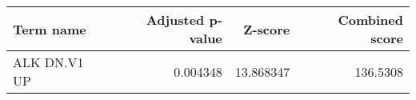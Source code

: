 \begin{tabular}{lrrr}
\toprule
   Term name &  Adjusted p-value &   Z-score &  Combined score \\
\midrule
ALK DN.V1 UP &          0.004348 & 13.868347 &        136.5308 \\
\bottomrule
\end{tabular}
